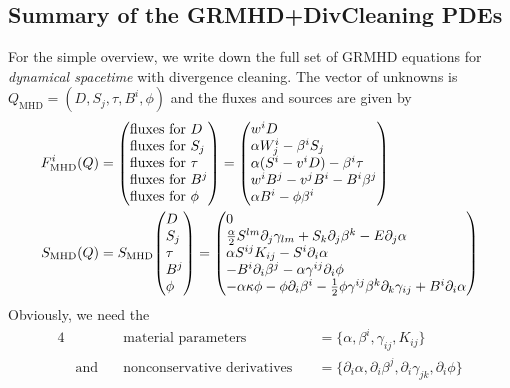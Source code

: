 \documentclass[a4paper]{article}
\newcommand{\desc}[1]{\text{#1}\quad}
\newcommand{\mhd}{\text{MHD}}
\newenvironment{pvector}{\begin{pmatrix*}[l]}{\end{pmatrix*}}
\begin{document}
\subsection{Summary of the GRMHD+DivCleaning PDEs}
For the simple overview, we write down the full set of GRMHD equations
for \emph{dynamical spacetime} with divergence cleaning. The vector of
unknowns is $Q_\mhd=(D,S_j,\tau,B^i,\phi)$ and the fluxes and sources are
given by
\begin{align}
F^i_\mhd(Q) &=
\begin{pvector}
\text{fluxes for } D \\
\text{fluxes for } S_j \\
\text{fluxes for } \tau \\
\text{fluxes for }  B^j \\
\text{fluxes for } \phi
\end{pvector}
=
\begin{pvector}
w^i D \\
\alpha W^i_j - \beta^i S_j \\
\alpha (S^i - v^i D) - \beta^i \tau \\
w^i B^j - v^j B^i - B^i \beta^j \\
\alpha B^i - \phi \beta^i
\end{pvector}
\\
S_\mhd(Q) &=
S_\mhd
\begin{pvector}
D \\
S_j \\
\tau \\
 B^j \\
\phi
\end{pvector}
=
\begin{pvector}
0
\\
\frac \alpha2 S^{lm} \partial_j \gamma_{lm} + S_k \partial_j \beta^k - E \partial_j \alpha
\\
\alpha S^{ij} K_{ij} - S^i \partial_i \alpha
\\
-B^i \partial_i \beta^j - \alpha \gamma^{ij} \partial_i \phi \\
- \alpha \kappa \phi - \phi \partial_i \beta^i
- \frac 12 \phi \gamma^{ij}
\beta^k \partial_k \gamma_{ij}
+ B^i \partial_i \alpha
\end{pvector}
\end{align}
Obviously, we need the
\begin{alignat}{4}
&&
\desc{material parameters}  &= \{ \alpha, \beta^i, \gamma_{ij}, K_{ij} \}
\\
&\desc{and}
&
\desc{nonconservative derivatives} &= \{ \partial_i \alpha,
\partial_i \beta^j, \partial_i \gamma_{jk}, \partial_i \phi \}
\end{alignat}
\end{document}

